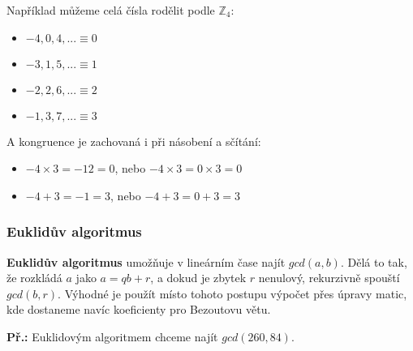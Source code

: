\documentclass[10pt,a4paper]{article}
\begin{document}
Například můžeme celá čísla rodělit podle $\mathbb{Z}_4$:
\begin{itemize}
\item ${-4, 0, 4, ...} \equiv  0$
\item ${-3, 1, 5, ...} \equiv  1$
\item ${-2, 2, 6, ...} \equiv  2$
\item ${-1, 3, 7, ...} \equiv  3$
\end{itemize}

A kongruence je zachovaná i při násobení a sčítání:

\begin{itemize}
\item $-4 \times 3 = -12 = 0$, nebo $-4 \times 3 = 0 \times 3 = 0$ 
\item $-4 + 3 = -1 = 3$, nebo $-4 + 3 = 0 + 3 = 3$ 
\end{itemize}

\subsubsection{Euklidův algoritmus}
\textbf{Euklidův algoritmus} umožňuje v lineárním čase najít $gcd(a,b)$. Dělá to tak, že rozkládá $a$ jako $a = qb + r$, a dokud je zbytek $r$ nenulový, rekurzivně spouští $gcd(b,r)$. Výhodné je použít místo tohoto postupu výpočet přes úpravy matic, kde dostaneme navíc koeficienty pro Bezoutovu větu.

\textbf{Př.:} Euklidovým algoritmem chceme najít $gcd(260, 84)$.

\begin{center}
\end{center}
\end{document}
